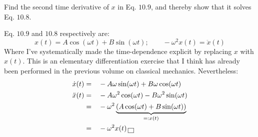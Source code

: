 \documentclass[solutions.tex]{subfiles}
\begin{document}
\maketitle
\begin{exercise} Find the second time derivative of $x$ in Eq. $10.9$,
and thereby show that it solves Eq. $10.8$.
\end{exercise}
Eq. $10.9$ and $10.8$ respectively are:
\[
	x(t) = A\cos(\omega t)+B\sin(\omega t);\qquad
	-\omega^2x(t) = \ddot{x}(t)
\]
Where I've systematically made the time-dependence explicit by
replacing $x$ with $x(t)$. This is an elementary differentiation
exercise that I think has already been performed in the previous
volume on classical mechanics. Nevertheless:
\begin{equation*}\begin{aligned}
	\dot{x}(t) &=&& -A\omega\sin(\omega t)+B\omega\cos(\omega t) \\
	\ddot{x}(t) &=&& -A\omega^2\cos(\omega t)-B\omega^2\sin(\omega t) \\
	~ &=&& -\omega^2\underbrace{
		(A\cos(\omega t) + B\sin(\omega t))
	}_{=:x(t)} \\
	~ &=&& -\omega^2x(t) \qed
\end{aligned}\end{equation*}
\end{document}
